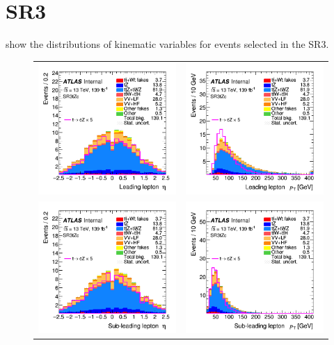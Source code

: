 \clearpage
\FloatBarrier
\newpage
\section{SR3\tZc}
\label{app:SRs:SR3}
 show the distributions 
of kinematic variables for events selected in the SR3\tZc.

\begin{figure}[!htbp]
	\centering
	\begin{tabular}{cc}
		\includegraphics[width=.35\textwidth]{Appendices/AP5/figures/SR3_UsingDL1rc/lep1_eta} &
		\includegraphics[width=.35\textwidth]{Appendices/AP5/figures/SR3_UsingDL1rc/lep1_pt} \\
		\includegraphics[width=.35\textwidth]{Appendices/AP5/figures/SR3_UsingDL1rc/lep2_eta} &
		\includegraphics[width=.35\textwidth]{Appendices/AP5/figures/SR3_UsingDL1rc/lep2_pt} \\

\end{tabular}
\end{figure}
